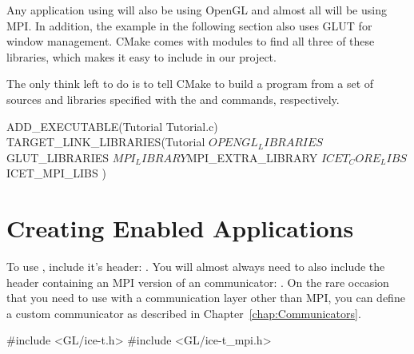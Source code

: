 Any application using \IceT will also be using OpenGL and
almost all will be using MPI.  In addition, the example in the
following section also uses GLUT for window management.  CMake
comes with modules to find all three of these libraries, which makes it
easy to include in our project.

The only think left to do is to tell CMake to build a program from a set of
sources and libraries specified with the  and
 commands, respectively.
\begin{code}
ADD_EXECUTABLE(Tutorial Tutorial.c)
TARGET_LINK_LIBRARIES(Tutorial
  ${OPENGL_LIBRARIES}
  ${GLUT_LIBRARIES}
  ${MPI_LIBRARY}
  ${MPI_EXTRA_LIBRARY}
  ${ICET_CORE_LIBS}
  ${ICET_MPI_LIBS}
  )
\end{code}

\section{Creating \IceT Enabled Applications}
\label{sec:Tutorial:Creating_IceT_Enabled_Applications}

To use \IceT, include it's header:
.  You will almost
always need to also include the header containing an MPI version of an
\IceT communicator:
.  On the
rare occasion that you need to use \IceT with a communication layer other
than MPI, you can define a custom communicator as described in
Chapter~\ref{chap:Communicators}.
\begin{code}
#include <GL/ice-t.h>
#include <GL/ice-t_mpi.h>
\end{code}

